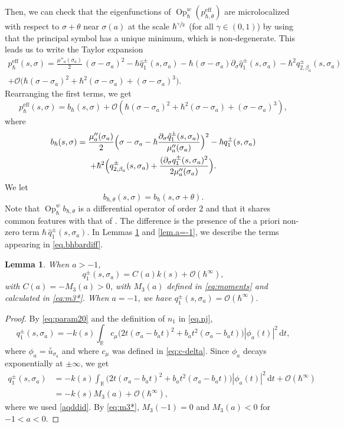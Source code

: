 \documentclass[JEP,XML,SOM,Unicode,NoFloatCountersInSection,published]{cedram}
\newcommand{\rd}{\,\mathrm{d}}
\newcommand{\eff}{\mathrm{eff}}
\DeclareMathOperator{\Op}{Op}
\theoremstyle{plain}
\newtheorem{lemma}[theorem]{Lemma}
\theoremstyle{definition}
\newcommand{\R}{\mathbb{R}}
\begin{document}
Then, we can check that the eigenfunctions of $\Op^w_\hbar(p^{\eff}_{\hbar,\theta})$ are microlocalized with respect to $\sigma+\theta$ near $\sigma(a)$ at the scale $\hbar^{\sfrac{\gamma}{2}}$ (for all $\gamma\in(0,1)$) by using that the principal symbol has a unique minimum, which is non-degenerate. This leads us to write the Taylor expansion
\begin{multline*}
p^{\eff}_{\hbar}(s,\sigma)=\frac{\mu''_a(\sigma_a)}{2}\,(\sigma-\sigma_a)^2-\hbar\hat q_{1}^\pm(s,\sigma_a)-\hbar(\sigma-\sigma_a)\partial_\sigma \hat q_1^\pm(s,\sigma_a)-\hbar^2q_{2,\beta_a}^\pm(s,\sigma_a)\\
+\mathscr{O}\bigl(\hbar(\sigma-\sigma_a)^2+\hbar^2(\sigma-\sigma_a)+(\sigma-\sigma_a)^3\bigr).
\end{multline*}
Rearranging the first terms, we get
\begin{equation}\label{eq.aefftob}
p^{\eff}_\hbar(s,\sigma)=b_\hbar(s,\sigma)
+\mathscr{O}(\hbar(\sigma-\sigma_a)^2+\hbar^2(\sigma-\sigma_a)+(\sigma-\sigma_a)^3),
\end{equation}
where
\begin{multline}\label{eq.bhbardiff}
b_\hbar(s,\sigma)=\frac{\mu''_a(\sigma_a)}{2}\Bigl(\sigma-\sigma_a-\hbar\frac{\partial_\sigma \hat q_1^\pm(s,\sigma_a)}{\mu''_a(\sigma_a)}\Bigr)^2-\hbar q_{1}^\pm(s,\sigma_a)\\
+\hbar^2\Bigl(q_{2,\beta_a}^\pm(s,\sigma_a)+\frac{(\partial_\sigma q_1^\pm(s,\sigma_a)^2}{2\mu''_a(\sigma_a)}\Bigr).
\end{multline}
We let
\[
b_{\hbar,\theta}(s,\sigma)=b_\hbar(s,\sigma+\theta).
\]
Note that $\Op^w_\hbar b_{\hbar,\theta}$ is a differential operator of order $2$ and that it shares common features with that of \cite[(8.10)]{BLTRS21}. The difference is the presence of the a priori non-zero term $\hbar\,\hat q_{1}^\pm(s,\sigma_a)$. In Lemmas \ref{lem.q1=Ck} and \ref{lem.a=-1}, we describe the terms appearing in \eqref{eq.bhbardiff}.

\begin{lemma}\label{lem.q1=Ck}
When $a>-1$,
\[
q_{1}^\pm(s,\sigma_a)=C(a)k(s)+{ \mathscr{O}(\hbar^\infty)},
\]
with $C(a)= -M_3(a)>0$, with $M_3(a)$ defined in \eqref{eq:moments} and calculated in \eqref{eq:m3*}. When $a=-1$, we have $ q_{1}^\pm(s,\sigma_a)=\mathscr{O}(\hbar^\infty)$.
\end{lemma}
\begin{proof}
By \eqref{eq:param20} and the definition of $n_1$ in \eqref{eq.nj},
\[
q_{1}^\pm(s,\sigma_a)= -k(s)\int_\R c_\mu \bigl(2t(\sigma_a-b_a t)^2+b_a t^2(\sigma_a-b_a t)\bigr)|\phi_a(t)|^2\rd t,
\]
where $\phi_a=\overset{\circ}{u}_{\sigma_a}$ and where $c_{\mu}$ was defined in \eqref{eq:c-delta}. Since $\phi_a$ decays exponentially at $\pm\infty$, we get
\begin{align*} q_{1}^\pm(s,\sigma_a)&= -k(s)\int_\R \bigl(2t(\sigma_a-b_a t)^2+b_a t^2(\sigma_a-b_a t)\bigr)|\phi_a(t)|^2\rd t+\mathscr{O}(\hbar^\infty)\\
&=-k(s)M_3(a)+\mathscr{O}(\hbar^\infty),
\end{align*}
where we used \eqref{aqddid}. By \eqref{eq:m3*}, $M_3(-1)=0$ and $M_3(a)<0$ for $-1<a<0$.
\end{proof}
\end{document}
